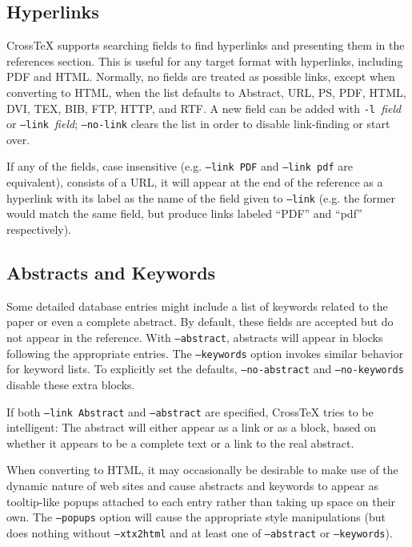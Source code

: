 \documentclass{article}
\newcommand{\XTX}{Cross\TeX}
\begin{document}
\subsection{Hyperlinks}

\XTX{} supports searching fields to find hyperlinks and presenting them
in the references section.  This is useful for any target format with
hyperlinks, including PDF and HTML.  Normally, no fields are treated
as possible links, except when converting to HTML, when the list
defaults to Abstract, URL, PS, PDF, HTML, DVI, TEX, BIB, FTP, HTTP,
and RTF.  A new field can be added with \texttt{-l~}\textit{field} or
\texttt{--link~}\textit{field}; \texttt{--no-link} clears the list in
order to disable link-finding or start over.

If any of the fields, case insensitive (e.g. \texttt{--link~PDF} and
\texttt{--link~pdf} are equivalent), consists of a URL, it will appear
at the end of the reference as a hyperlink with its label as the name
of the field given to \texttt{--link} (e.g. the former would match the
same field, but produce links labeled ``PDF'' and ``pdf'' respectively).

\subsection{Abstracts and Keywords}

Some detailed database entries might include a list of keywords related
to the paper or even a complete abstract.  By default, these fields are
accepted but do not appear in the reference.  With \texttt{--abstract},
abstracts will appear in blocks following the appropriate entries.
The \texttt{--keywords} option invokes similar behavior for keyword
lists.  To explicitly set the defaults, \texttt{--no-abstract} and
\texttt{--no-keywords} disable these extra blocks.

If both \texttt{--link~Abstract} and \texttt{--abstract} are specified,
\XTX{} tries to be intelligent: The abstract will either appear as a
link or as a block, based on whether it appears to be a complete text
or a link to the real abstract.

When converting to HTML, it may occasionally be desirable to make use of
the dynamic nature of web sites and cause abstracts and keywords to appear
as tooltip-like popups attached to each entry rather than taking up space
on their own.  The \texttt{--popups} option will cause the appropriate
style manipulations (but does nothing without \texttt{--xtx2html} and
at least one of \texttt{--abstract} or \texttt{--keywords}).
\end{document}
